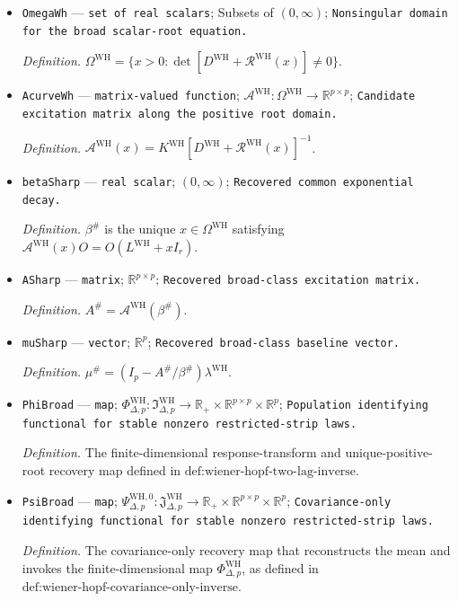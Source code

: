 \documentclass{article}
\begin{document}
\begin{itemize}
  \item \texttt{OmegaWh} --- \texttt{set of real scalars}; Subsets of \((0,\infty)\); \texttt{Nonsingular domain for the broad scalar-\allowbreak{}root equation.}
  \par\smallskip\noindent\emph{Definition.} \(\Omega^{\mathrm{WH}}=\{x>0:\det[D^{\mathrm{WH}}+\mathcal R^{\mathrm{WH}}(x)]\neq0\}\).
  \item \texttt{AcurveWh} --- \texttt{matrix-\allowbreak{}valued function}; \(\mathcal A^{\mathrm{WH}}:\Omega^{\mathrm{WH}}\to\mathbb R^{p\times p}\); \texttt{Candidate excitation matrix along the positive root domain.}
  \par\smallskip\noindent\emph{Definition.} \(\mathcal A^{\mathrm{WH}}(x)=K^{\mathrm{WH}}[D^{\mathrm{WH}}+\mathcal R^{\mathrm{WH}}(x)]^{-1}\).
  \item \texttt{betaSharp} --- \texttt{real scalar}; \((0,\infty)\); \texttt{Recovered common exponential decay.}
  \par\smallskip\noindent\emph{Definition.} \(\beta^{\#}\) is the unique \(x\in\Omega^{\mathrm{WH}}\) satisfying \(\mathcal A^{\mathrm{WH}}(x)O=O(L^{\mathrm{WH}}+xI_r)\).
  \item \texttt{ASharp} --- \texttt{matrix}; \(\mathbb R^{p\times p}\); \texttt{Recovered broad-\allowbreak{}class excitation matrix.}
  \par\smallskip\noindent\emph{Definition.} \(A^{\#}=\mathcal A^{\mathrm{WH}}(\beta^{\#})\).
  \item \texttt{muSharp} --- \texttt{vector}; \(\mathbb R^p\); \texttt{Recovered broad-\allowbreak{}class baseline vector.}
  \par\smallskip\noindent\emph{Definition.} \(\mu^{\#}=(I_p-A^{\#}/\beta^{\#})\lambda^{\mathrm{WH}}\).
  \item \texttt{PhiBroad} --- \texttt{map}; \(\Phi_{\Delta,p}^{\mathrm{WH}}:\mathfrak I_{\Delta,p}^{\mathrm{WH}}\to\mathbb R_+\times\mathbb R^{p\times p}\times\mathbb R^p\); \texttt{Population identifying functional for stable nonzero restricted-\allowbreak{}strip laws.}
  \par\smallskip\noindent\emph{Definition.} The finite-dimensional response-transform and unique-positive-root recovery map defined in \(\text{def:wiener-hopf-two-lag-inverse}\).
  \item \texttt{PsiBroad} --- \texttt{map}; \(\Psi_{\Delta,p}^{\mathrm{WH},0}:\mathfrak J_{\Delta,p}^{\mathrm{WH}}\to\mathbb R_+\times\mathbb R^{p\times p}\times\mathbb R^p\); \texttt{Covariance-\allowbreak{}only identifying functional for stable nonzero restricted-\allowbreak{}strip laws.}
  \par\smallskip\noindent\emph{Definition.} The covariance-only recovery map that reconstructs the mean and invokes the finite-dimensional map \(\Phi_{\Delta,p}^{\mathrm{WH}}\), as defined in \(\text{def:wiener-hopf-covariance-only-inverse}\).
\end{itemize}
\end{document}
